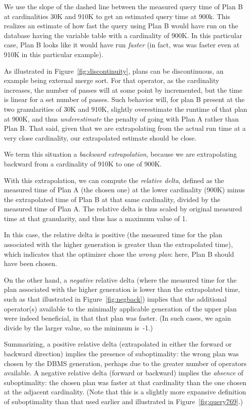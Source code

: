 \documentclass[prodmode,acmtods]{acmsmall}
\begin{document}
We use the slope of the dashed line between the measured query time of Plan
B at cardinalities 30K and 910K to get an estimated query time at 900k.
This realizes an estimate of how fast the query using Plan B would have run
on the database having the variable table with a cardinality of 900K. In
this particular case, Plan B looks like it would have run {\em faster} (in
fact, was was faster even at 910K in this particular example).

As illustrated in Figure~\ref{fig:discontinuity}, plans can be
discontinuous, an example being external merge sort. For that operator, as
the cardinality increases, the number of passes  will at some point by
incremented, but the time is linear for a set number of passes.
Such behavior will, for plan B present at
the two granularities of 30K and 910K, slightly overestimate the runtime of
that plan at 900K, and thus {\em underestimate} the penalty of going with
Plan A rather than Plan B. That said,
given that we are extrapolating from the actual run time at a very
close cardinality, our extrapolated estimate should be close.

We term this situation a {\em backward extrapolation}, because we are extrapolating
backward from a cardinality of 910K to one of 900K.

With this extrapolation, we can compute the {\em relative delta}, defined as the
measured time of Plan A (the chosen one) at the lower cardinality (900K) minus the
extrapolated time of Plan B at that same cardinality, divided by the
measured time of Plan A. The relative delta is thus scaled by original
measured time at that granularity, and thus has a maximum value of 1.

In this case, the relative delta is positive (the measured time for the plan
associated with the higher generation is greater than the extrapolated
time), which indicates that the optimizer chose the {\em wrong plan}: here,
Plan B should have been chosen.  

On the other hand, a {\em negative} relative delta (where the measured
time for the plan associated with the higher generation is lower than the
extrapolated time, such as that illustrated in Figure~\ref{fig:negback})
implies that the additional operator(s) available to the minimally
applicable generation of the upper plan were indeed beneficial, in that that
plan was faster. (In such cases, we again divide by the larger
value, so the minimum is~-1.)

Summarizing, a
positive relative delta (extrapolated in either the forward or backward direction) implies the presence of suboptimality: the wrong
plan was chosen by the \hbox{DBMS} generation, perhaps due to the greater number of
operators available. A negative relative delta (forward or backward) implies the {\em absence} of
suboptimality: the chosen plan was faster at that cardinality than the one
chosen at the adjacent cardinality. (Note that this is a slightly more expansive definition
of suboptimality than that used earlier and illustrated in
Figure~\ref{fig:query769}.)
\end{document}
